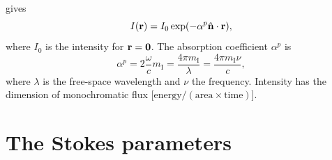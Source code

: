  gives
\begin{equation}
  I(\mathbf{r}) = I_0 \exp(-\alpha^p \hat{{\bf n}} \cdot \mathbf{r}),
\end{equation}
where $I_0$ is the intensity for $\mathbf{r} = \mathbf{0}$. The absorption
coefficient $\alpha^p$ is
\begin{equation}
  \alpha^p =
  2 \frac{\omega}{c} m_{\mathrm{I}} =
    \frac{4\pi m_{\mathrm{I}}}{\lambda} =
    \frac{4\pi m_{\mathrm{I}}\nu}{c},
\end{equation}
where $\lambda$ is the free-space wavelength and $\nu$ the frequency.
Intensity has the dimension of monochromatic flux
[$\mathrm{energy}/(\mathrm{area}\times\mathrm{time})$].
  

\section[The Stokes parameters]{The Stokes parameters}
\label{sec:rtetheory:Stokes_components}
  

